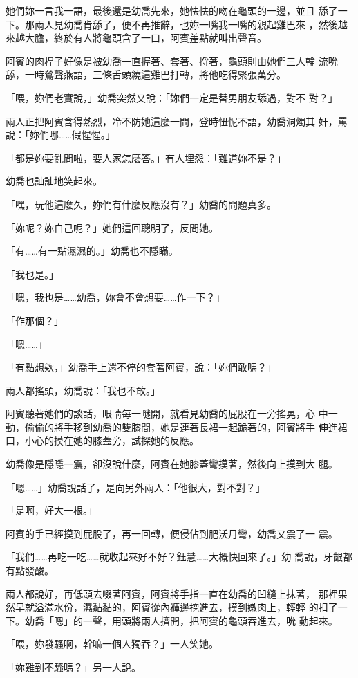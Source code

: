 她們妳一言我一語，最後還是幼喬先來，她怯怯的吻在龜頭的一邊，並且
舔了一下。那兩人見幼喬肯舔了，便不再推辭，也妳一嘴我一嘴的親起雞巴來
，然後越來越大膽，終於有人將龜頭含了一口，阿賓差點就叫出聲音。

阿賓的肉桿子好像是被幼喬一直握著、套著、捋著，龜頭則由她們三人輪
流吮舔，一時鶯聲燕語，三條舌頭繞這雞巴打轉，將他吃得緊張萬分。

「喂，妳們老實說，」幼喬突然又說：「妳們一定是替男朋友舔過，對不
對？」

兩人正把阿賓含得熱烈，冷不防她這麼一問，登時忸怩不語，幼喬洞燭其
奸，罵說：「妳們哪……假惺惺。」

「都是妳要亂問啦，要人家怎麼答。」有人埋怨：「難道妳不是？」

幼喬也訕訕地笑起來。

「嘿，玩他這麼久，妳們有什麼反應沒有？」幼喬的問題真多。

「妳呢？妳自己呢？」她們這回聰明了，反問她。

「有……有一點濕濕的。」幼喬也不隱瞞。

「我也是。」

「嗯，我也是……幼喬，妳會不會想要……作一下？」

「作那個？」

「嗯……」

「有點想欸，」幼喬手上還不停的套著阿賓，說：「妳們敢嗎？」

兩人都搖頭，幼喬說：「我也不敢。」

阿賓聽著她們的談話，眼睛每一瞇開，就看見幼喬的屁股在一旁搖晃，心
中一動，偷偷的將手移到幼喬的雙膝間，她是連著長裙一起跪著的，阿賓將手
伸進裙口，小心的摸在她的膝蓋旁，試探她的反應。

幼喬像是隱隱一震，卻沒說什麼，阿賓在她膝蓋彎摸著，然後向上摸到大
腿。

「嗯……」幼喬說話了，是向另外兩人：「他很大，對不對？」

「是啊，好大一根。」

阿賓的手已經摸到屁股了，再一回轉，便侵佔到肥沃月彎，幼喬又震了一
震。

「我們……再吃一吃……就收起來好不好？鈺慧……大概快回來了。」幼
喬說，牙齦都有點發酸。

兩人都說好，再低頭去啜著阿賓，阿賓將手指一直在幼喬的凹縫上抹著，
那裡果然早就溢滿水份，濕黏黏的，阿賓從內褲邊挖進去，摸到嫩肉上，輕輕
的扣了一下。幼喬「嗯」的一聲，用頭將兩人擠開，把阿賓的龜頭吞進去，吮
動起來。

「喂，妳發騷啊，幹嘛一個人獨吞？」一人笑她。

「妳難到不騷嗎？」另一人說。

